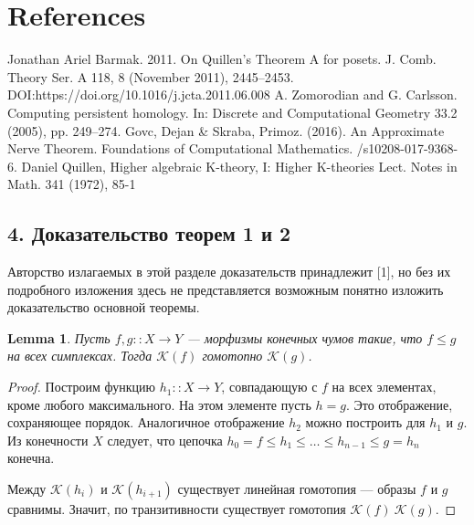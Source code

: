 \documentclass[a4paper, 12pt]{article}
\newtheorem{lemma}{Lemma}
\theoremstyle{definition}
\theoremstyle{remark}
\begin{document}
\section{References}

\begin{enumerate}
  Jonathan Ariel Barmak. 2011.
  \newblock On Quillen’s Theorem A for posets.
  \newblock J. Comb. Theory Ser. A 118, 8 (November 2011), 2445–2453.
  \newblock DOI:https://doi.org/10.1016/j.jcta.2011.06.008
  A. Zomorodian and G. Carlsson.
  \newblock Computing persistent homology.
  \newblock In: Discrete and Computational Geometry 33.2 (2005), pp. 249–274.
  Govc, Dejan \& Skraba, Primoz. (2016).
  \newblock An Approximate Nerve Theorem.
  \newblock Foundations of Computational Mathematics.
  /s10208-017-9368-6.
  Daniel Quillen,
  \newblock Higher algebraic K-theory, I: Higher K-theories Lect.
  \newblock Notes in Math. 341 (1972), 85-1
\end{enumerate}

\subsection*{4. Доказательство теорем 1 и 2}

Авторство излагаемых в этой разделе доказательств принадлежит [1], но без их подробного изложения здесь не представляется возможным понятно изложить доказательство основной теоремы.\\

\begin{lemma}
  Пусть $f,g :: X \to Y$ --- морфизмы конечных чумов такие, что $f \leqslant g$ на всех симплексах. Тогда $\mathcal{K}(f)$ гомотопно $\mathcal{K}(g)$.
\end{lemma}
\begin{proof}
  Построим функцию $h_1 :: X \to Y$, совпадающую с $f$ на всех элементах, кроме любого максимального. На этом элементе пусть $h = g$. Это отображение, сохраняющее порядок. Аналогичное отображение $h_2$ можно построить для $h_1$ и $g$.
  Из конечности $X$ следует, что цепочка $h_0 = f \leqslant h_1 \leqslant \ldots \leqslant h_{n-1} \leqslant g = h_n$ конечна.

  Между $\mathcal{K}(h_i)$ и $\mathcal{K}(h_{i+1})$ существует линейная гомотопия --- образы $f$ и $g$ сравнимы. Значит, по транзитивности существует гомотопия $\mathcal{K}(f) ~ \mathcal{K}(g)$.
\end{proof}
\end{document}
